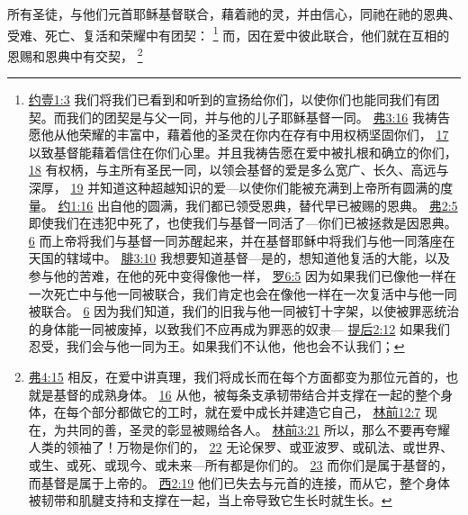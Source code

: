 \documentclass[12pt, a4paper, oneside]{ctexart}
\newcounter{parnum}[section]
\newcommand{\N}{%
   \noindent\refstepcounter{parnum}%
    \makebox[\parindent][l]{\textbf{\arabic{parnum}.}}}
\begin{document}
\N 所有圣徒，与他们元首耶稣基督联合，藉着祂的灵，并由信心，同祂在祂的恩典、受难、死亡、复活和荣耀中有团契：
	\footnote {
		\href{https://biblehub.com/1_john/1-3.htm}{约壹1:3} 我们将我们已看到和听到的宣扬给你们，以使你们也能同我们有团契。而我们的团契是与父一同，并与他的儿子耶稣基督一同。
		\href{https://biblehub.com/ephesians/3-16.htm}{弗3:16} 我祷告愿他从他荣耀的丰富中，藉着他的圣灵在你内在存有中用权柄坚固你们，
		\href{https://biblehub.com/ephesians/3-17.htm}{17} 以致基督能藉着信住在你们心里。并且我祷告愿在爱中被扎根和确立的你们，
		\href{https://biblehub.com/ephesians/3-18.htm}{18} 有权柄，与主所有圣民一同，以领会基督的爱是多么宽广、长久、高远与深厚，
		\href{https://biblehub.com/ephesians/3-19.htm}{19} 并知道这种超越知识的爱---以使你们能被充满到上帝所有圆满的度量。
		\href{https://biblehub.com/john/1-16.htm}{约1:16} 出自他的圆满，我们都已领受恩典，替代早已被赐的恩典。
		\href{https://biblehub.com/ephesians/2-5.htm}{弗2:5} 即使我们在违犯中死了，也使我们与基督一同活了---你们已被拯救是因恩典。 
		\href{https://biblehub.com/ephesians/2-6.htm}{6} 而上帝将我们与基督一同苏醒起来，并在基督耶稣中将我们与他一同落座在天国的辖域中。
		\href{https://biblehub.com/philippians/3-10.htm}{腓3:10} 我想要知道基督---是的，想知道他复活的大能，以及参与他的苦难，在他的死中变得像他一样，
		\href{https://biblehub.com/romans/6-5.htm}{罗6:5} 因为如果我们已像他一样在一次死亡中与他一同被联合，我们肯定也会在像他一样在一次复活中与他一同被联合。
		\href{https://biblehub.com/romans/6-6.htm}{6} 因为我们知道，我们的旧我与他一同被钉十字架，以使被罪恶统治的身体能一同被废掉，以致我们不应再成为罪恶的奴隶---
		\href{https://biblehub.com/2_timothy/2-12.htm}{提后2:12} 如果我们忍受，我们会与他一同为王。如果我们不认他，他也会不认我们；
	}
	而，因在爱中彼此联合，他们就在互相的恩赐和恩典中有交契，
	\footnote {
		\href{https://biblehub.com/ephesians/4-15.htm}{弗4:15} 相反，在爱中讲真理，我们将成长而在每个方面都变为那位元首的，也就是基督的成熟身体。
		\href{https://biblehub.com/ephesians/4-16.htm}{16} 从他，被每条支承韧带结合并支撑在一起的整个身体，在每个部分都做它的工时，就在爱中成长并建造它自己，
		\href{https://biblehub.com/1_corinthians/12-7.htm}{林前12:7} 现在，为共同的善，圣灵的彰显被赐给各人。
		\href{https://biblehub.com/1_corinthians/3-21.htm}{林前3:21} 所以，那么不要再夸耀人类的领袖了！万物是你们的，
		\href{https://biblehub.com/1_corinthians/3-22.htm}{22} 无论保罗、或亚波罗、或矶法、或世界、或生、或死、或现今、或未来---所有都是你们的。
		\href{https://biblehub.com/1_corinthians/3-23.htm}{23} 而你们是属于基督的，而基督是属于上帝的。
		\href{https://biblehub.com/colossians/2-19.htm}{西2:19} 他们已失去与元首的连接，而从它，整个身体被韧带和肌腱支持和支撑在一起，当上帝导致它生长时就生长。
	}
\end{document}
